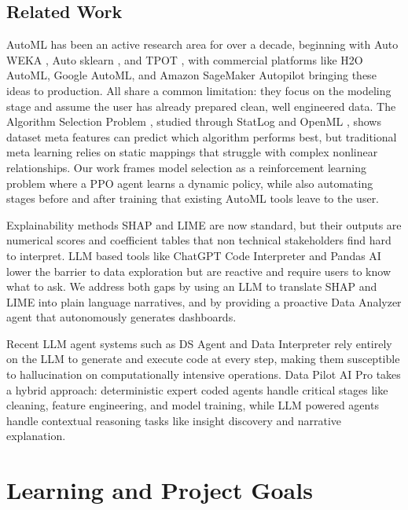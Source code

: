 \documentclass{article}
\begin{document}
\subsection{Related Work}

AutoML has been an active research area for over a decade, beginning with Auto WEKA \citep{thornton2013auto}, Auto sklearn \citep{feurer2015efficient}, and TPOT \citep{olson2016tpot}, with commercial platforms like H2O AutoML, Google AutoML, and Amazon SageMaker Autopilot bringing these ideas to production. All share a common limitation: they focus on the modeling stage and assume the user has already prepared clean, well engineered data. The Algorithm Selection Problem \citep{rice1976algorithm}, studied through StatLog and OpenML \citep{vanschoren2014openml}, shows dataset meta features can predict which algorithm performs best, but traditional meta learning relies on static mappings that struggle with complex nonlinear relationships. Our work frames model selection as a reinforcement learning problem where a PPO agent learns a dynamic policy, while also automating stages before and after training that existing AutoML tools leave to the user.

Explainability methods SHAP \citep{lundberg2017unified} and LIME \citep{ribeiro2016lime} are now standard, but their outputs are numerical scores and coefficient tables that non technical stakeholders find hard to interpret. LLM based tools like ChatGPT Code Interpreter and Pandas AI lower the barrier to data exploration but are reactive and require users to know what to ask. We address both gaps by using an LLM to translate SHAP and LIME into plain language narratives, and by providing a proactive Data Analyzer agent that autonomously generates dashboards.

Recent LLM agent systems such as DS Agent \citep{guo2024dsagent} and Data Interpreter \citep{Hong2024data} rely entirely on the LLM to generate and execute code at every step, making them susceptible to hallucination on computationally intensive operations. Data Pilot AI Pro takes a hybrid approach: deterministic expert coded agents handle critical stages like cleaning, feature engineering, and model training, while LLM powered agents handle contextual reasoning tasks like insight discovery and narrative explanation.




\section{Learning and Project Goals}
\end{document}
